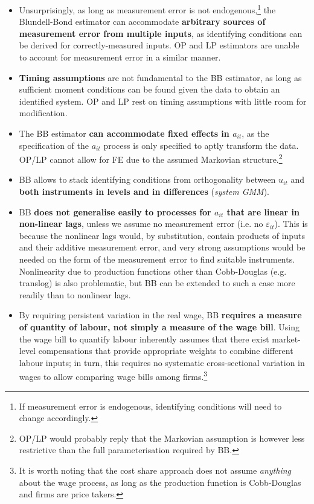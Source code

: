 \documentclass[11pt]{article}
\begin{document}
\begin{itemize}
	\item Unsurprisingly, as long as measurement error is not endogenous,\footnote{If measurement error is endogenous, identifying conditions will need to change accordingly.} the Blundell-Bond estimator can accommodate \textbf{arbitrary sources of measurement error from multiple inputs}, as identifying conditions can be derived for correctly-measured inputs. OP and LP estimators are unable to account for measurement error in a similar manner.
	\item \textbf{Timing assumptions} are not fundamental to the BB estimator, as long as sufficient moment conditions can be found given the data to obtain an identified system. OP and LP rest on timing assumptions with little room for modification.
	\item The BB estimator \textbf{can accommodate fixed effects in $a_{it}$}, as the specification of the $a_{it}$ process is only specified to aptly transform the data. OP/LP cannot allow for FE due to the assumed Markovian structure.\footnote{OP/LP would probably reply that the Markovian assumption is however less restrictive than the full parameterisation required by BB.}
	\item BB allows to stack identifying conditions from orthogonality between $u_{it}$ and \textbf{both instruments in levels and in differences} (\textit{system GMM}).
	\item BB \textbf{does not generalise easily to processes for $a_{it}$ that are linear in non-linear lags}, unless we assume no measurement error (i.e. no $\varepsilon_{it}$). This is because the nonlinear lags would, by substitution, contain products of inputs and their additive measurement error, and very strong assumptions would be needed on the form of the measurement error to find suitable instruments.
	Nonlinearity due to production functions other than Cobb-Douglas (e.g. translog) is also problematic, but BB can be extended to such a case more readily than to nonlinear lags.
	\item By requiring persistent variation in the real wage, BB \textbf{requires a measure of quantity of labour, not simply a measure of the wage bill}. Using the wage bill to quantify labour inherently assumes that there exist market-level compensations that provide appropriate weights to combine different labour inputs; in turn, this requires no systematic cross-sectional variation in wages to allow comparing wage bills among firms.\footnote{It is worth noting that the cost share approach does not assume \textit{anything} about the wage process, as long as the production function is Cobb-Douglas and firms are price takers.}
\end{itemize}
\end{document}
